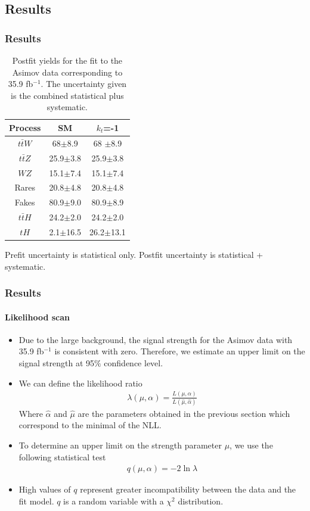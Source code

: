 \documentclass[11pt]{beamer}
\begin{document}
\begin{frame}
\section{Results}
\frametitle{Results}
	\begin{table}[ht!]
		\centering
		\caption*{Postfit yields for the fit to the Asimov data corresponding to 35.9 fb$^{-1}$. The uncertainty given is the combined statistical plus systematic.}
		\begin{tabular}{ccc}
			\hline
			Process & SM & $k_{t}$=-1 \\
			\hline
			$t\bar{t}W$ & 68$\pm$8.9& 68 $\pm$8.9 \\
			$t\bar{t}Z$ & 25.9$\pm$3.8&25.9$\pm$3.8\\
			$WZ$ & 15.1$\pm$7.4& 15.1$\pm$7.4\\
			Rares & 20.8$\pm$4.8& 20.8$\pm$4.8 \\
			Fakes & 80.9$\pm$9.0& 80.9$\pm$8.9 \\
			$t\bar{t}H$ & 24.2$\pm$2.0 & 24.2$\pm$2.0 \\
			\hline
			$tH$& 2.1$\pm$16.5 &26.2$\pm$13.1 
		\end{tabular}
		\label{table1}
	\end{table}
 Prefit uncertainty is statistical only. Postfit uncertainty is statistical + systematic.
\end{frame}



\begin{frame}
\frametitle{Results}
\framesubtitle{Likelihood scan}
{\small
	\begin{itemize}
\item Due to the large background, the signal strength for the Asimov data with 35.9 fb$^{-1}$ is consistent with zero.
Therefore, we estimate an upper limit on the signal strength at 95$\%$ confidence level.
\item We can define the likelihood ratio
\begin{align}
\lambda(\mu,\alpha)=\frac{L(\mu,\alpha)}{L(\hat{\mu},\hat{\alpha})}
\end{align}
Where $\hat{\alpha}$ and $\hat{\mu}$ are the parameters obtained in the previous section which correspond to the minimal of the NLL.
\item To determine an upper limit on the strength parameter $\mu$, we use the following statistical test
\begin{align}
q(\mu,\alpha)= -2\ln{\lambda} 
\end{align}
\item High values of $q$ represent greater incompatibility between the data and the fit model.
$q$ is a random variable with a $\chi^2$ distribution.
\end{itemize}
}
\end{frame}
\end{document}
